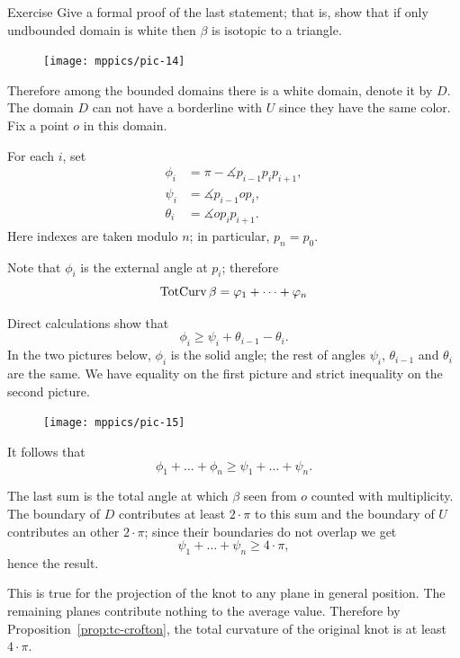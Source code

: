\begin{thm}{Exercise}
Give a formal proof of the last statement; that is, show that if only undbounded domain is white then $\beta$ is isotopic to a triangle. 
\end{thm}

\begin{figure}
\vskip-4mm
\centering
\texttt{[image: mppics/pic-14]}
\vskip0mm
\end{figure}

Therefore among the bounded domains there is a white domain, denote it by $D$.
The domain $D$ can not have a borderline with $U$ since they have the same color.
Fix a point $o$ in this domain.

For each $i$, set 
\begin{align*}
\phi_i&=\pi-\measuredangle p_{i-1}p_ip_{i+1},
\\
\psi_i&=\measuredangle p_{i-1} o p_{i},
\\
\theta_i&=\measuredangle o p_i p_{i+1}.
\end{align*}
Here indexes are taken modulo $n$; in particular, $p_{n}=p_0$.


Note that $\phi_i$ is the external angle at $p_i$;
therefore 
\[\mathop{\rm TotCurv}\nolimits\beta= \varphi_1+\dots+\varphi_n\]

Direct calculations show that 
\[\phi_i\ge \psi_i+\theta_{i-1}-\theta_i.\]
In the two pictures below, $\phi_i$ is the solid angle;
the rest of angles $\psi_i$, $\theta_{i-1}$ and $\theta_i$
are the same.
We have equality on the first picture and strict inequality on the second picture.

\begin{figure}[h]
\vskip-0mm
\centering
\texttt{[image: mppics/pic-15]}
\vskip0mm
\end{figure}

It follows that 
\[\phi_1+\dots+\phi_n\ge \psi_1+\dots+\psi_n.\]

The last sum 
is the total angle at  which $\beta$ seen from $o$ counted with multiplicity. 
The boundary of $D$ contributes at least $2\cdot\pi$ to this sum and the boundary of $U$ contributes an other $2\cdot\pi$;
since their boundaries do not overlap we get 
\[\psi_1+\dots+\psi_n\ge 4\cdot\pi,\]
hence the result.

This is true for the projection of the knot to any plane in general position.
The remaining planes contribute nothing to the average value.
Therefore by Proposition~\ref{prop:tc-crofton}, the total curvature of the original knot is at least $4\cdot\pi$.
\qeds



